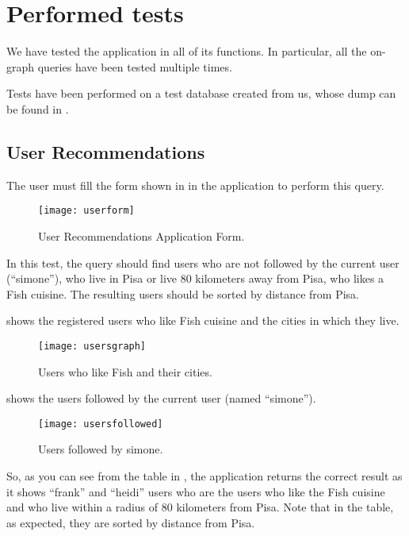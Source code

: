 \chapter{Performed tests}\label{ch:tests}

We have tested the application in all of its functions. In particular, all the
on-graph queries have been tested multiple times.

Tests have been performed on a test database created from us, whose dump can be
found in .

\section{User Recommendations}

The user must fill the form shown in  in the application to
perform this query.

\begin{figure}[htb]
	\centering
	\texttt{[image: userform]}
	\caption{User Recommendations Application Form.}\label{fig:userform}
\end{figure}

In this test, the query should find users who are not followed by the current
user (``simone''), who live in Pisa or live 80 kilometers away from Pisa, who
likes a Fish cuisine. The resulting users should be sorted by distance from
Pisa.

 shows the registered users who like Fish cuisine and the
cities in which they live.

\begin{figure}[htb]%
	\centering
	\texttt{[image: usersgraph]}
	\caption{Users who like Fish and their cities.}\label{fig:usersgraph}
\end{figure}

 shows the users followed by the current user (named
``simone'').

\begin{figure}[htb]%
	\centering
	\texttt{[image: usersfollowed]}
	\caption{Users followed by simone.}\label{fig:usersfollowed}
\end{figure}

So, as you can see from the table in , the application
returns the correct result as it shows ``frank'' and ``heidi'' users who are the
users who like the Fish cuisine and who live within a radius of 80 kilometers
from Pisa. Note that in the table, as expected, they are sorted by distance from
Pisa.


